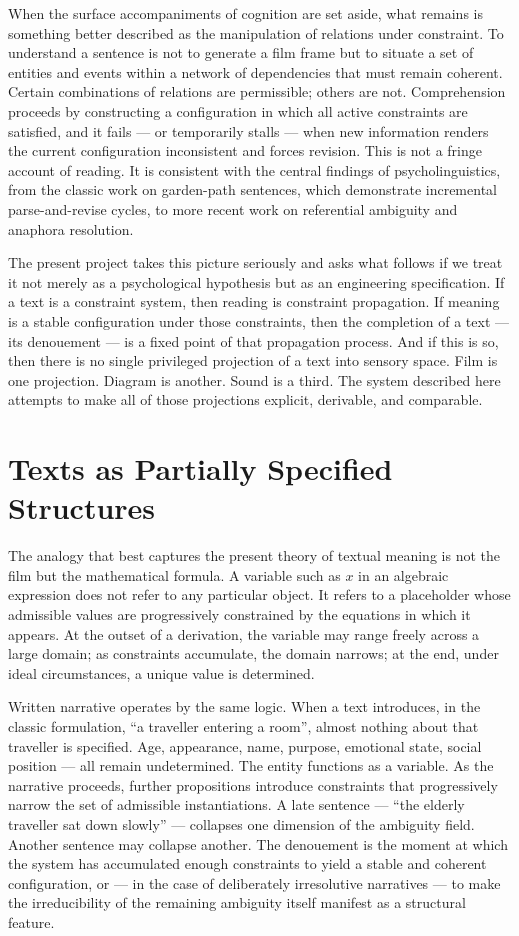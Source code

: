 \documentclass[12pt, a4paper]{article}
\begin{document}
When the surface accompaniments of cognition are set aside, what remains is something better described as the manipulation of relations under constraint. To understand a sentence is not to generate a film frame but to situate a set of entities and events within a network of dependencies that must remain coherent. Certain combinations of relations are permissible; others are not. Comprehension proceeds by constructing a configuration in which all active constraints are satisfied, and it fails — or temporarily stalls — when new information renders the current configuration inconsistent and forces revision. This is not a fringe account of reading. It is consistent with the central findings of psycholinguistics, from the classic work on garden-path sentences, which demonstrate incremental parse-and-revise cycles, to more recent work on referential ambiguity and anaphora resolution.

The present project takes this picture seriously and asks what follows if we treat it not merely as a psychological hypothesis but as an engineering specification. If a text is a constraint system, then reading is constraint propagation. If meaning is a stable configuration under those constraints, then the completion of a text — its denouement — is a fixed point of that propagation process. And if this is so, then there is no single privileged projection of a text into sensory space. Film is one projection. Diagram is another. Sound is a third. The system described here attempts to make all of those projections explicit, derivable, and comparable.

\section{Texts as Partially Specified Structures}

The analogy that best captures the present theory of textual meaning is not the film but the mathematical formula. A variable such as $x$ in an algebraic expression does not refer to any particular object. It refers to a placeholder whose admissible values are progressively constrained by the equations in which it appears. At the outset of a derivation, the variable may range freely across a large domain; as constraints accumulate, the domain narrows; at the end, under ideal circumstances, a unique value is determined.

Written narrative operates by the same logic. When a text introduces, in the classic formulation, \enquote{a traveller entering a room}, almost nothing about that traveller is specified. Age, appearance, name, purpose, emotional state, social position — all remain undetermined. The entity functions as a variable. As the narrative proceeds, further propositions introduce constraints that progressively narrow the set of admissible instantiations. A late sentence — \enquote{the elderly traveller sat down slowly} — collapses one dimension of the ambiguity field. Another sentence may collapse another. The denouement is the moment at which the system has accumulated enough constraints to yield a stable and coherent configuration, or — in the case of deliberately irresolutive narratives — to make the irreducibility of the remaining ambiguity itself manifest as a structural feature.
\end{document}
